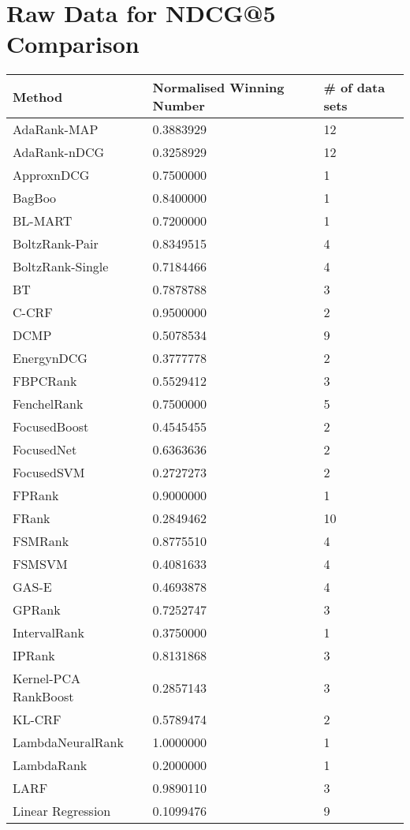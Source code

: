 \chapter{Raw Data for NDCG@5 Comparison}
\label{app:norm_winnum_ndcg5}

\begin{longtable}{l|l|l}
Method & Normalised Winning Number & \# of data sets \\
\hline
AdaRank-\acs{MAP} & 0.3883929 & 12 \\ 
AdaRank-\acs{nDCG} & 0.3258929 & 12 \\ 
Approx\acs{nDCG} & 0.7500000 & 1 \\ 
BagBoo & 0.8400000 & 1 \\ 
BL-MART & 0.7200000 & 1 \\ 
BoltzRank-Pair & 0.8349515 & 4 \\ 
BoltzRank-Single & 0.7184466 & 4 \\ 
BT & 0.7878788 & 3 \\ 
C-\acs{CRF} & 0.9500000 & 2 \\ 
DCMP & 0.5078534 & 9 \\ 
Energy\ac{nDCG} & 0.3777778 & 2 \\ 
FBPCRank & 0.5529412 & 3 \\ 
FenchelRank & 0.7500000 & 5 \\ 
FocusedBoost & 0.4545455 & 2 \\ 
FocusedNet & 0.6363636 & 2 \\ 
Focused\acs{SVM} & 0.2727273 & 2 \\ 
FPRank & 0.9000000 & 1 \\ 
FRank & 0.2849462 & 10 \\ 
FSMRank & 0.8775510 & 4 \\ 
FSM\acs{SVM} & 0.4081633 & 4 \\ 
GAS-E & 0.4693878 & 4 \\ 
\acs{GPRank} & 0.7252747 & 3 \\ 
IntervalRank & 0.3750000 & 1 \\ 
\acs{IP}Rank & 0.8131868 & 3 \\ 
Kernel-\acs{PCA} RankBoost & 0.2857143 & 3 \\ 
KL-\acs{CRF} & 0.5789474 & 2 \\ 
LambdaNeuralRank & 1.0000000 & 1 \\ 
LambdaRank & 0.2000000 & 1 \\ 
LARF & 0.9890110 & 3 \\ 
Linear Regression & 0.1099476 & 9 \\ 

\end{longtable}

